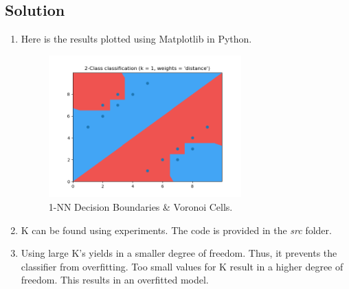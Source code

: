 \documentclass[12pt]{article}
\numberwithin{equation}{section}
\numberwithin{table}{section}
\numberwithin{figure}{section}
\begin{document}
\subsection*{Solution}
\begin{enumerate}[label=(\alph*)]
	\item 	Here is the results plotted using Matplotlib in Python.
	\begin{figure}[!h]\centering
		\includegraphics[width=0.7\textwidth]{4_2.png}
		\caption{1-NN Decision Boundaries \& Voronoi Cells.}
		\label{pl1}
	\end{figure}

	\item K can be found using experiments. The code is provided in the \textit{src} folder.
	
	\item Using large K's yields in a smaller degree of freedom. Thus, it prevents the classifier from overfitting. Too small values for K result in a higher degree of freedom. This results in an overfitted model.
\end{enumerate}
\end{document}
